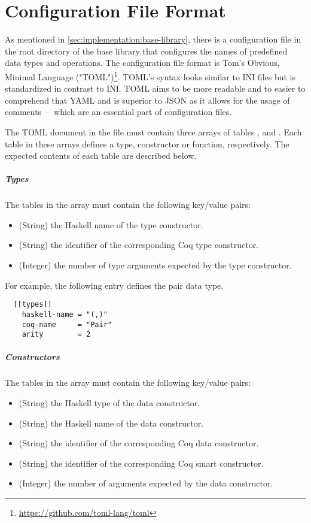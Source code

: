 \chapter{Configuration File Format} \label{appendix:config}
As mentioned in \autoref{sec:implementation:base-library}, there is a configuration file in the root directory of the base library that configures the names of predefined data types and operations.
The configuration file format is Tom's Obvious, Minimal Language ("TOML")\footnote{\url{https://github.com/toml-lang/toml}}.
TOML's syntax looks similar to INI files but is standardized in contrast to INI.
TOML aims to be more readable and to easier to comprehend that YAML and is superior to JSON as it allows for the usage of comments~--~which are an essential part of configuration files.

The TOML document in the  file must contain three arrays of tables ,  and .
Each table in these arrays defines a type, constructor or function, respectively.
The expected contents of each table are described below.

\paragraph{Types}
The tables in the  array must contain the following key/value pairs:
\begin{itemize}
  \item {} (String) the Haskell name of the type constructor.
  \item {} (String) the identifier of the corresponding Coq type constructor.
  \item {} (Integer) the number of type arguments expected by the type constructor.
\end{itemize}

For example, the following entry defines the pair data type.
\begin{verbatim}
  [[types]]
    haskell-name = "(,)"
    coq-name     = "Pair"
    arity        = 2
\end{verbatim}

\paragraph{Constructors}
The tables in the  array must contain the following
key/value pairs:
\begin{itemize}
  \item {} (String) the Haskell type of the data constructor.
  \item {} (String) the Haskell name of the data constructor.
  \item {} (String) the identifier of the corresponding Coq data constructor.
  \item {} (String) the identifier of the corresponding Coq
    smart constructor.
  \item {} (Integer) the number of arguments expected by the data constructor.
\end{itemize}

